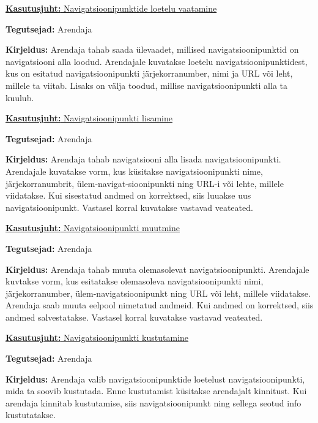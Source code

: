 \documentclass[a4paper,12pt]{article} %
\begin{document}
\underline{\textbf{Kasutusjuht:} Navigatsioonipunktide loetelu vaatamine}
\par
\textbf{Tegutsejad:} Arendaja
\par
\textbf{Kirjeldus:} Arendaja tahab saada ülevaadet, millised navigatsioonipunktid on navigatsiooni alla loodud. Arendajale kuvatakse loetelu navigatsioonipunktidest, kus on esitatud navigatsioonipunkti järjekorranumber, nimi ja URL või leht, millele ta viitab. Lisaks on välja toodud, millise navigatsioonipunkti alla ta kuulub.
\par

\underline{\textbf{Kasutusjuht:} Navigatsioonipunkti lisamine}
\par
\textbf{Tegutsejad:} Arendaja
\par
\textbf{Kirjeldus:} Arendaja tahab navigatsiooni alla lisada navigatsioonipunkti. Arendajale kuvatakse vorm, kus küsitakse navigatsioonipunkti nime, järjekorranumbrit, ülem-navigat-sioonipunkti ning URL-i või lehte, millele viidatakse. Kui sisestatud andmed on korrektsed, siis luuakse uus navigatsioonipunkt. Vastasel korral kuvatakse vastavad veateated.
\par

\underline{\textbf{Kasutusjuht:} Navigatsioonipunkti muutmine}
\par
\textbf{Tegutsejad:} Arendaja
\par
\textbf{Kirjeldus:} Arendaja tahab muuta olemasolevat navigatsioonipunkti. Arendajale kuvtakse vorm, kus esitatakse olemasoleva navigatsioonipunkti nimi, järjekorranumber, ülem-navigatsioonipunkt ning URL või leht, millele viidatakse. Arendaja saab muuta eelpool nimetatud andmeid. Kui andmed on korrektsed, siis andmed salvestatakse. Vastasel korral kuvatakse vastavad veateated.
\par

\underline{\textbf{Kasutusjuht:} Navigatsioonipunkti kustutamine}
\par
\textbf{Tegutsejad:} Arendaja
\par
\textbf{Kirjeldus:} Arendaja valib navigatsioonipunktide loetelust navigatsioonipunkti, mida ta soovib kustutada. Enne kustutamist küsitakse arendajalt kinnitust. Kui arendaja kinnitab kustutamise, siis navigatsioonipunkt ning sellega seotud info kustutatakse.
\par
\end{document}
